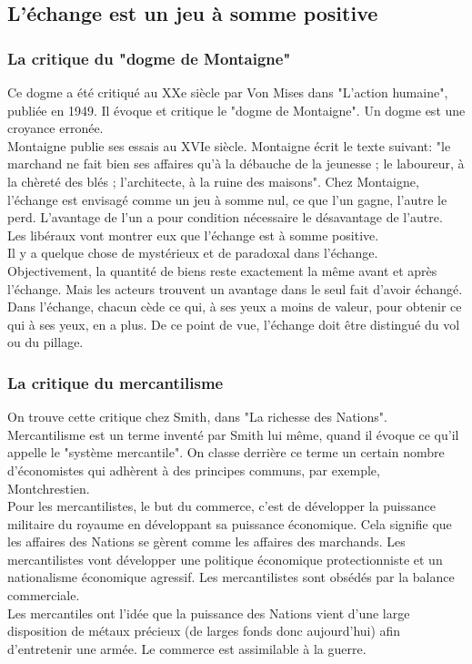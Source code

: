 \documentclass[10pt, a4paper, openany]{book}
\begin{document}
\subsection{L'échange est un jeu à somme positive}

\subsubsection{La critique du "dogme de Montaigne"}

Ce dogme a été critiqué au XXe siècle par Von Mises dans "L'action humaine", publiée en 1949. Il évoque et critique le "dogme de Montaigne". Un dogme est une croyance erronée. \\
Montaigne publie ses essais au XVIe siècle. Montaigne écrit le texte suivant: "le marchand ne fait bien ses affaires qu'à la débauche de la jeunesse ; le laboureur, à la chèreté des blés ; l'architecte, à la ruine des maisons". Chez Montaigne, l'échange est envisagé comme un jeu à somme nul, ce que l'un gagne, l'autre le perd. L'avantage de l'un a pour condition nécessaire le désavantage de l'autre. Les libéraux vont montrer eux que l'échange est à somme positive. \\
Il y a quelque chose de mystérieux et de paradoxal dans l'échange. Objectivement, la quantité de biens reste exactement la même avant et après l'échange. Mais les acteurs trouvent un avantage dans le seul fait d'avoir échangé. Dans l'échange, chacun cède ce qui, à ses yeux a moins de valeur, pour obtenir ce qui à ses yeux, en a plus. De ce point de vue, l'échange doit être distingué du vol ou du pillage. 

\subsubsection{La critique du mercantilisme}

On trouve cette critique chez Smith, dans "La richesse des Nations". Mercantilisme est un terme inventé par Smith lui même, quand il évoque ce qu'il appelle le "système mercantile". On classe derrière ce terme un certain nombre d'économistes qui adhèrent à des principes communs, par exemple, Montchrestien. \\
Pour les mercantilistes, le but du commerce, c'est de développer la puissance militaire du royaume en développant sa puissance économique. Cela signifie que les affaires des Nations se gèrent comme les affaires des marchands. Les mercantilistes vont développer une politique économique protectionniste et un nationalisme économique agressif. Les mercantilistes sont obsédés par la balance commerciale. \\
Les mercantiles ont l'idée que la puissance des Nations vient d'une large disposition de métaux précieux (de larges fonds donc aujourd'hui) afin d'entretenir une armée. Le commerce est assimilable à la guerre. 
\end{document}

